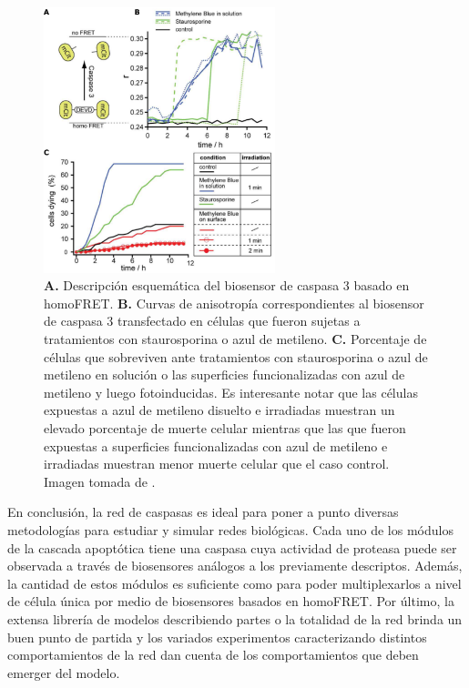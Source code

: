 \begin{figure}
    \centering
    \includegraphics[width=0.6\textwidth]{img/cap_1/stegemann.pdf}
    \caption{\footnotesize{\textbf{A.} Descripción esquemática del biosensor de caspasa 3 basado en homoFRET. \textbf{B.} Curvas de anisotropía correspondientes al biosensor de caspasa 3 transfectado en células que fueron sujetas a tratamientos con staurosporina o azul de metileno. \textbf{C.} Porcentaje de células que sobreviven ante tratamientos con staurosporina o azul de metileno en solución o las superficies funcionalizadas con azul de metileno y luego fotoinducidas. Es interesante notar que las células expuestas a azul de metileno disuelto e irradiadas muestran un elevado porcentaje de muerte celular mientras que las que fueron expuestas a superficies funcionalizadas con azul de metileno e irradiadas muestran menor muerte celular que el caso control.  Imagen tomada de \cite{Stegemann2015}.}}
    \label{fig:stegemann}
\end{figure}

En conclusión, la red de caspasas es ideal para poner a punto diversas metodologías para estudiar y simular redes biológicas. Cada uno de los módulos de la cascada apoptótica tiene una caspasa cuya actividad de proteasa puede ser observada a través de biosensores análogos a los previamente descriptos. Además, la cantidad de estos módulos es suficiente como para poder multiplexarlos a nivel de célula única por medio de biosensores basados en homoFRET. Por último, la extensa librería de modelos describiendo partes o la totalidad de la red brinda un buen punto de partida y los variados experimentos caracterizando distintos comportamientos de la red dan cuenta de los comportamientos que deben emerger del modelo.


